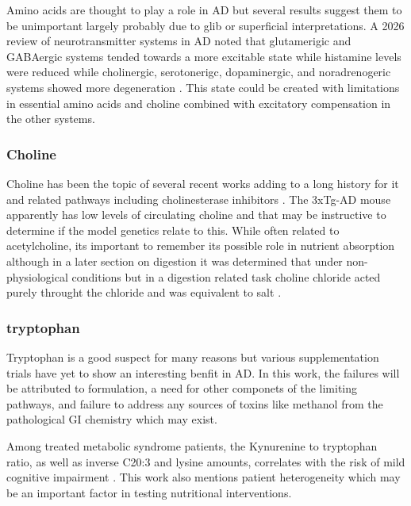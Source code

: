 Amino acids are thought to play a role in AD but 
several results suggest them to be unimportant largely
probably due to glib or superficial interpretations.
A 2026 review of neurotransmitter systems in AD noted
that glutamerigic and GABAergic systems tended towards a more
excitable state while  histamine levels were reduced while  
  cholinergic, serotonerigc, 
dopaminergic, and noradrenogeric systems showed more
degeneration \cite{PMC13026079}. This state could be created
with limitations in essential amino acids and choline combined
with excitatory compensation in the other systems. 


\subsubsection{Choline }
Choline has been the topic of several recent works
\cite{Dave_Judd_Decker_Dietary_choline_intake_2023}
\cite{PMC7041773} 
adding to a long history for it 
\cite{Velazquez_Ferreira_Knowles_Lifelong_choline_supplementation_ameliorates_2019}
\cite{10.7554/eLife.89889}
and related pathways 
\cite{FU2004258} including cholinesterase inhibitors
\cite{Dementia_CognitiveImprovementGroup_Cholinesterase_inhibitors_Alzheimer_2016}.
The 3xTg-AD mouse apparently has low levels of circulating 
choline
\cite{PMC12745837}
and that may be instructive to determine if the model genetics
relate to this.
While often related to acetylcholine, its important to remember
its possible role in nutrient absorption although in a later
section on digestion it was determined that under non-physiological
conditions but in a digestion related task  choline chloride
acted purely throught the chloride and was equivalent to salt
\cite{doi:10.1021/acs.iecr.9b03588}. 


\subsubsection{tryptophan}
Tryptophan is a good suspect for many reasons but various supplementation
trials have yet to show an interesting benfit in AD. In this work,
the failures will be attributed to formulation, a need for other
componets of the limiting pathways, and failure to address any sources
of toxins like methanol from the pathological GI chemistry which may exist.




Among treated metabolic syndrome patients, the Kynurenine to 
tryptophan ratio, as well as inverse C20:3 and lysine
amounts, correlates with the  risk of mild cognitive impairment 
\cite{doi:10.1021/acsomega.5c09713}. This work also mentions
patient heterogeneity which may be an important factor in 
testing nutritional interventions.

